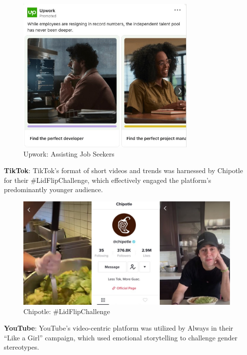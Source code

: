 \documentclass[
]{book}
\begin{document}
\begin{figure}
\centering
\includegraphics[width=0.79\textwidth,height=\textheight]{images/upwork.jpg}
\caption{Upwork: Assisting Job Seekers}
\end{figure}

\textbf{TikTok}: TikTok's format of short videos and trends was harnessed by Chipotle for their \#LidFlipChallenge, which effectively engaged the platform's predominantly younger audience.

\begin{figure}
\centering
\includegraphics[width=318mm,height=\textheight]{images/chipotle.jpg}
\caption{Chipotle: \#LidFlipChallenge}
\end{figure}

\textbf{YouTube}: YouTube's video-centric platform was utilized by Always in their ``Like a Girl'' campaign, which used emotional storytelling to challenge gender stereotypes.
\end{document}
